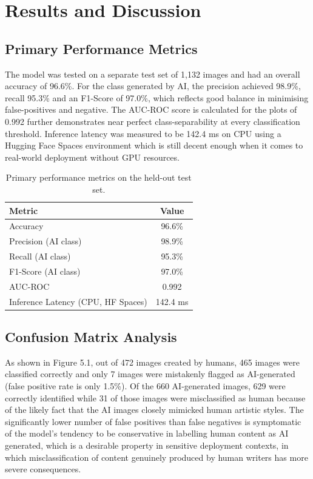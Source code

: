 \chapter{Results and Discussion}
\label{ch:results}

\section{Primary Performance Metrics}

The model was tested on a separate test set of 1,132 images and had an overall accuracy of 96.6\%. For the class generated by AI, the precision achieved 98.9\%, recall 95.3\% and an F1-Score of 97.0\%, which reflects good balance in minimising false-positives and negative. The AUC-ROC score is calculated for the plots of 0.992 further demonstrates near perfect class-separability at every classification threshold. Inference latency was measured to be 142.4 ms on CPU using a Hugging Face Spaces environment which is still decent enough when it comes to real-world deployment without GPU resources.

\begin{table}[htbp]
    \centering
    \caption{Primary performance metrics on the held-out test set.}
    \label{tab:metrics}
    \begin{tabular}{lc}
        \toprule
        \textbf{Metric} & \textbf{Value} \\
        \midrule
        Accuracy                          & 96.6\% \\
        Precision (AI class)              & 98.9\% \\
        Recall (AI class)                 & 95.3\% \\
        F1-Score (AI class)               & 97.0\% \\
        AUC-ROC                           & 0.992 \\
        Inference Latency (CPU, HF Spaces) & 142.4 ms \\
        \bottomrule
    \end{tabular}
\end{table}

\section{Confusion Matrix Analysis}

As shown in Figure 5.1, out of 472 images created by humans, 465 images were classified correctly and only 7 images were mistakenly flagged as AI-generated (false positive rate is only 1.5\%). Of the 660 AI-generated images, 629 were correctly identified while 31 of those images were misclassified as human because of the likely fact that the AI images closely mimicked human artistic styles. The significantly lower number of false positives than false negatives is symptomatic of the model's tendency to be conservative in labelling human content as AI generated, which is a desirable property in sensitive deployment contexts, in which misclassification of content genuinely produced by human writers has more severe consequences.

